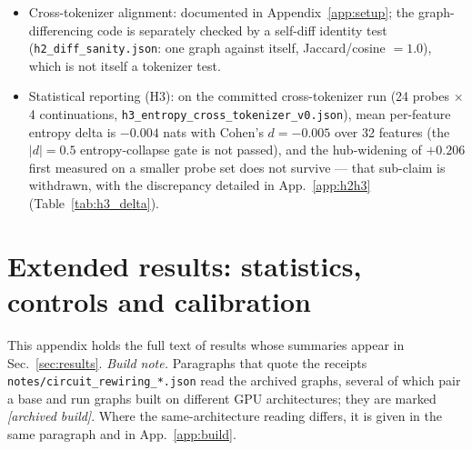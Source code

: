 \documentclass{article}
\begin{document}
\begin{itemize}[leftmargin=*]
(\texttt{trl}~$0.11.4$/\texttt{peft} for training, \texttt{sae-lens}/\texttt{transformer-lens} for analysis), the Hugging Face caches for \texttt{Qwen3-1.7B} and the SAE weights, and the GRPO/Tulu checkpoints, which are third-party artifacts or large training outputs referenced by name rather than vendored; the training scripts that produce them are released here.
\item Cross-tokenizer alignment: documented in Appendix~\ref{app:setup}; the graph-differencing code is separately checked by a self-diff identity test (\texttt{h2\_diff\_sanity.json}: one graph against itself, Jaccard/cosine $=1.0$), which is not itself a tokenizer test.
\item Statistical reporting (H3): on the committed cross-tokenizer run (24 probes $\times$ 4 continuations, \texttt{h3\_entropy\_cross\_tokenizer\_v0.json}), mean per-feature entropy delta is $-0.004$ nats with Cohen's $d=-0.005$ over 32 features (the $|d|=0.5$ entropy-collapse gate is not passed), and the hub-widening of $+0.206$ first measured on a smaller probe set does not survive --- that sub-claim is withdrawn, with the discrepancy detailed in App.~\ref{app:h2h3} (Table~\ref{tab:h3_delta}).
\end{itemize}

\section{Extended results: statistics, controls and calibration}
\label{app:extended}

This appendix holds the full text of results whose summaries appear in Sec.~\ref{sec:results}. \emph{Build note.} Paragraphs that quote the receipts \texttt{notes/circuit\_rewiring\_*.json} read the archived graphs, several of which pair a base and run graphs built on different GPU architectures; they are marked \emph{[archived build]}. Where the same-architecture reading differs, it is given in the same paragraph and in App.~\ref{app:build}.
\end{document}
